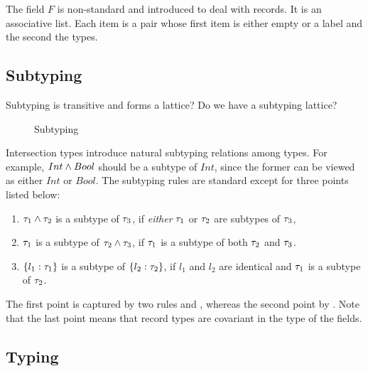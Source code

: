 The field $ F $ is non-standard and introduced to deal with records. It is an
associative list. Each item is a pair whose first item is either empty or a
label and the second the types.




\subsection{Subtyping}

Subtyping is transitive and forms a lattice?
Do we have a subtyping lattice?

\begin{figure*}

\caption{Subtyping}
\end{figure*}

Intersection types introduce natural subtyping relations among types. For
example, $ Int \wedge Bool $ should be a subtype of $ Int $, since the
former can be viewed as either $ Int $ or $ Bool $. The subtyping rules are
standard except for three points listed below:
\begin{enumerate}
\item $ \tau_1 \wedge \tau_2 $ is a subtype of $ \tau_3 $, if \emph{either} $ \tau_1 $ or
  $ \tau_2 $ are subtypes of $ \tau_3 $,

\item $ \tau_1 $ is a subtype of $ \tau_2 \wedge \tau_3 $, if $ \tau_1 $ is a subtype of
  both $ \tau_2 $ and $ \tau_3 $.

\item $ \{ l_1 : \tau_1 \} $ is a subtype of $ \{ l_2 : \tau_2 \} $, if
  $ l_1 $ and $ l_2 $ are identical and $ \tau_1 $ is a subtype of $ \tau_2 $.
\end{enumerate}
The first point is captured by two rules  and ,
whereas the second point by . Note that the last point means
that record types are covariant in the type of the fields.

\subsection{Typing}

